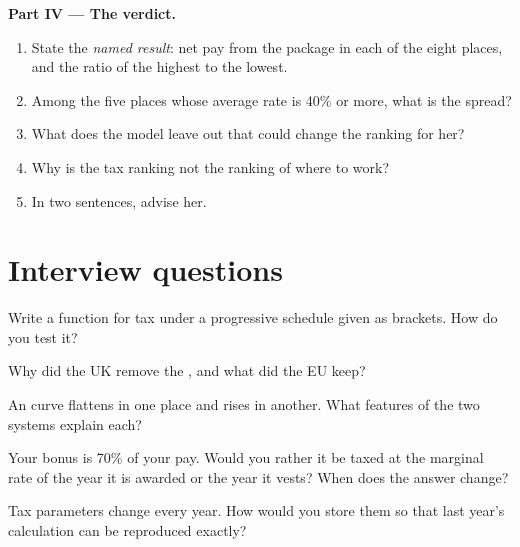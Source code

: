 \begin{problem}
\medskip\noindent\textbf{Part IV --- The verdict.}
\begin{enumerate}[resume]
\item State the \emph{named result}: net pay from the package in each of the eight places, and the ratio of the highest to
the lowest.
\item Among the five places whose average rate is 40\% or more, what is the spread?
\item What does the model leave out that could change the ranking for her?
\item Why is the tax ranking not the ranking of where to work?
\item In two sentences, advise her.
\end{enumerate}
\end{problem}

\section{Interview questions}

\begin{interviewq}\label{iq:in:pay-regulation-and-tax-by-location:1}
Write a function for tax under a progressive schedule given as brackets. How do you test it?
\end{interviewq}

\begin{interviewq}\label{iq:in:pay-regulation-and-tax-by-location:2}
Why did the UK remove the , and what did the EU keep?
\end{interviewq}

\begin{interviewq}\label{iq:in:pay-regulation-and-tax-by-location:3}
An  curve flattens in one place and rises in another. What features of the two systems explain each?
\end{interviewq}

\begin{interviewq}\label{iq:in:pay-regulation-and-tax-by-location:4}
Your bonus is 70\% of your pay. Would you rather it be taxed at the marginal rate of the year it is awarded or the year it
vests? When does the answer change?
\end{interviewq}

\begin{interviewq}\label{iq:in:pay-regulation-and-tax-by-location:5}
Tax parameters change every year. How would you store them so that last year's calculation can be reproduced exactly?
\end{interviewq}

